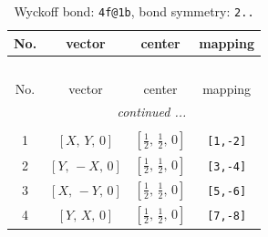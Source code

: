 \documentclass[fleqn,8pt]{jsarticle}
\begin{document}
\renewcommand{\arraystretch}{1.2}
\begin{longtable}{cccc}
\caption{Wyckoff bond: {\tt 4f@1b}, bond symmetry: {\tt 2..}}
 \\
 \hline \hline
No. & vector & center & mapping \\ \hline \endfirsthead

\multicolumn{3}{l}{\tablename\ \thetable{}} \\
 \hline \hline
No. & vector & center & mapping \\ \hline \endhead

 \hline \hline
\multicolumn{3}{r}{\footnotesize\it continued ...} \\ \endfoot

 \hline \hline
\multicolumn{3}{r}{} \\ \endlastfoot

1 & $\left[ X,\, Y,\, 0 \right]$ & $\left[ \frac{1}{2},\, \frac{1}{2},\, 0 \right]$ & {\tt [1,-2]} \\ \hline
2 & $\left[ Y,\, - X,\, 0 \right]$ & $\left[ \frac{1}{2},\, \frac{1}{2},\, 0 \right]$ & {\tt [3,-4]} \\ \hline
3 & $\left[ X,\, - Y,\, 0 \right]$ & $\left[ \frac{1}{2},\, \frac{1}{2},\, 0 \right]$ & {\tt [5,-6]} \\ \hline
4 & $\left[ Y,\, X,\, 0 \right]$ & $\left[ \frac{1}{2},\, \frac{1}{2},\, 0 \right]$ & {\tt [7,-8]} \\
\end{longtable}
\renewcommand{\arraystretch}{1.2}
\end{document}
